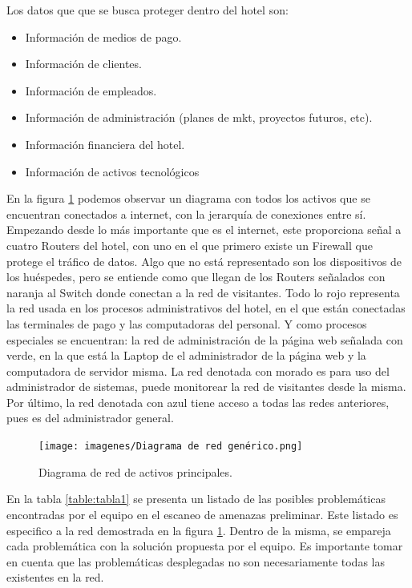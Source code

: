 \documentclass[10pt]{article}
\begin{document}
Los datos que que se busca proteger dentro del hotel son:
\begin{itemize}
    \item Información de medios de pago.
    \item Información de clientes.
    \item Información de empleados.
    \item Información de administración (planes de mkt, proyectos futuros, etc).
    \item Información financiera del hotel. 
    \item Información de activos tecnológicos
\end{itemize}

En la figura \ref{fig:diagramaTI} podemos observar un diagrama con todos los activos que se encuentran conectados a internet, con la jerarquía de conexiones entre sí. Empezando desde lo más importante que es el internet, este proporciona señal a cuatro Routers del hotel, con uno en el que primero existe un Firewall que protege el tráfico de datos. Algo que no está representado son los dispositivos de los huéspedes, pero se entiende como que llegan de los Routers señalados con naranja al Switch donde conectan a la red de visitantes.  Todo lo rojo representa la red usada en los procesos administrativos del hotel, en el que están conectadas las terminales de pago y las computadoras del personal. Y como procesos especiales se encuentran: la red de administración de la página web señalada con verde, en la que está la Laptop de el administrador de la página web y la computadora de servidor misma. La red denotada con morado es para uso del administrador de sistemas, puede monitorear la red de visitantes desde la misma. Por último, la red denotada con azul tiene acceso a todas las redes anteriores, pues es del administrador general.  

\begin{figure}[H]
    \centering
    \texttt{[image: imagenes/Diagrama de red genérico.png]}
    \caption{Diagrama de red de activos principales.}
    \label{fig:diagramaTI}
\end{figure}

En la tabla \ref{table:tabla1}  se presenta un listado de las posibles problemáticas encontradas por el equipo en el escaneo de amenazas preliminar. Este listado es especifico a la red demostrada en la figura \ref{fig:diagramaTI}. Dentro de la misma, se empareja cada problemática con la solución propuesta por el equipo. Es importante tomar en cuenta que las problemáticas desplegadas no son necesariamente todas las existentes en la red. 
\end{document}
